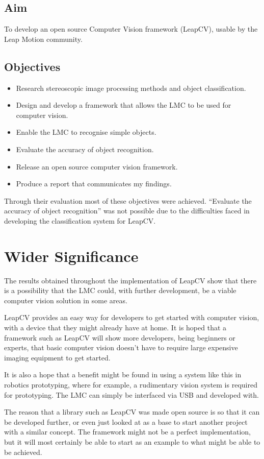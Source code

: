 \documentclass[11pt,oneside]{report}
\begin{document}
	\subsection{Aim}
	To develop an open source Computer Vision framework (LeapCV), usable by the Leap Motion community.
	\subsection{Objectives}
	\begin{itemize}
		\item Research stereoscopic image processing methods and object classification.
		\item Design and develop a framework that allows the LMC to be used for computer vision.
		\item Enable the LMC to recognise simple objects.
		\item Evaluate the accuracy of object recognition.
		\item Release an open source computer vision framework.
		\item Produce a report that communicates my findings.
	\end{itemize}
	
	Through their evaluation most of these objectives were achieved.
	``Evaluate the accuracy of object recognition'' was not possible due to the difficulties faced in developing the classification system for LeapCV.
	
	\section{Wider Significance}
		The results obtained throughout the implementation of LeapCV show that there is a possibility that the LMC could, with further development, be a viable computer vision solution in some areas.
		
		LeapCV provides an easy way for developers to get started with computer vision, with a device that they might already have at home.
		It is hoped that a framework such as LeapCV will show more developers, being beginners or experts, that basic computer vision doesn't have to require large expensive imaging equipment to get started.
		
		It is also a hope that a benefit might be found in using a system like this in robotics prototyping, where for example, a rudimentary vision system is required for prototyping.
		The LMC can simply be interfaced via USB and developed with.
		
		The reason that a library such as LeapCV was made open source is so that it can be developed further, or even just looked at as a base to start another project with a similar concept.
		The framework might not be a perfect implementation, but it will most certainly be able to start as an example to what might be able to be achieved.
		
\end{document}
